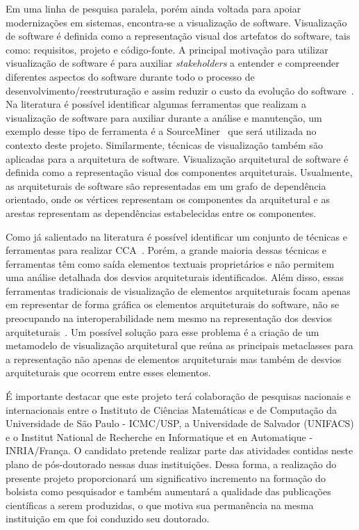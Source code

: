 \documentclass[12pt]{article}
\begin{document}
Em uma linha de pesquisa paralela, porém ainda voltada para apoiar modernizações em sistemas, encontra-se a visualização de software. Visualização de software é definida como a representação visual dos artefatos do software, tais como: requisitos, projeto e código-fonte. A principal motivação para utilizar visualização de software é para auxiliar \textit{stakeholders} a entender e compreender diferentes aspectos do software durante todo o processo de desenvolvimento/reestruturação e assim reduzir o custo da evolução do software~\cite{Diehl_2007, Gallagher_2008}. Na literatura é possível identificar algumas ferramentas que realizam a visualização de software para auxiliar durante a análise e manutenção, um exemplo desse tipo de  ferramenta é a SourceMiner~\cite{source_miner_glauco} que será utilizada no contexto deste projeto. Similarmente, técnicas de visualização também são aplicadas para a arquitetura de software. Visualização arquitetural de software é definida como a representação visual dos componentes arquiteturais. Usualmente, as arquiteturais de software são representadas em um grafo de dependência orientado, onde os vértices representam os componentes da arquitetural e as arestas representam as dependências estabelecidas entre os componentes. 

Como já salientado na literatura é possível identificar um conjunto de técnicas e ferramentas para realizar CCA~\cite{Maffort_2013, Knodel_2007, ArchJava_2202}. Porém, a grande maioria dessas técnicas e ferramentas têm como saída elementos textuais proprietários e não permitem uma análise detalhada dos desvios arquiteturais identificados. Além disso, essas ferramentas tradicionais de visualização de elementos arquiteturais focam apenas em representar de forma gráfica os elementos arquiteturais do software, não se preocupando na interoperabilidade nem mesmo na representação dos desvios arquiteturais~\cite{Diehl_2007, Gallagher_2008}. Um possível solução para esse problema é a criação de um metamodelo de visualização arquitetural que reúna as principais metaclasses para a representação não apenas de elementos arquiteturais mas também de desvios arquiteturais que ocorrem entre esses elementos. 

É importante destacar que este projeto terá colaboração de pesquisas nacionais e internacionais entre o Instituto de Ciências Matemáticas e de Computação da Universidade de São Paulo - ICMC/USP, a Universidade de Salvador (UNIFACS) e o Institut National de Recherche en Informatique et en Automatique - INRIA/França. O candidato pretende realizar parte das atividades contidas neste plano de pós-doutorado nessas duas instituições. Dessa forma, a realização do presente projeto proporcionará um significativo incremento na formação do bolsista como pesquisador e também aumentará a qualidade das publicações científicas a serem produzidas, o que motiva sua permanência na mesma instituição em que foi conduzido seu doutorado.
\end{document}
